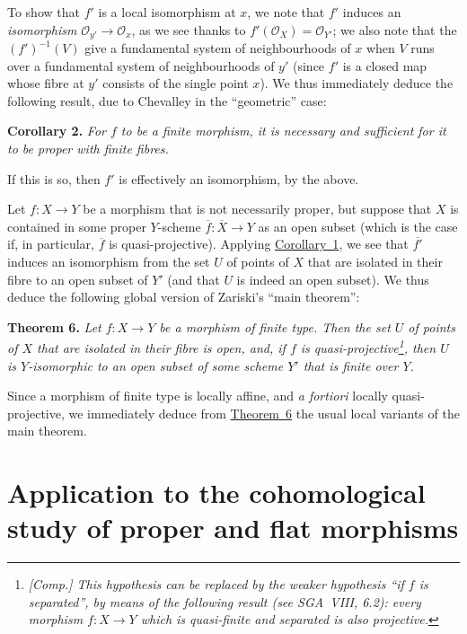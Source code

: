 \documentclass{article}
\newenvironment{itenv}[1]
  {\phantomsection\par\medskip\noindent\textbf{#1.}\itshape}
  {\par\medskip}
\newcommand{\scr}[1]{{\mathscr{#1}}}
\begin{document}
To show that $f'$ is a local isomorphism at $x$, we note that $f'$ induces an \emph{isomorphism} $\scr{O}_{y'}\to\scr{O}_x$, as we see thanks to $f'(\scr{O}_X)=\scr{O}_{Y'}$;
we also note that the $(f')^{-1}(V)$ give a fundamental system of neighbourhoods of $x$ when $V$ runs over a fundamental system of neighbourhoods of $y'$ (since $f'$ is a closed map whose fibre at $y'$ consists of the single point $x$).
We thus immediately deduce the following result, due to Chevalley in the ``geometric'' case:

\begin{itenv}{Corollary 2}
\label{theorem5corollary2}
  For $f$ to be a finite morphism, it is necessary and sufficient for it to be proper with finite fibres.
\end{itenv}

If this is so, then $f'$ is effectively an isomorphism, by the above.

Let $f\colon X\to Y$ be a morphism that is not necessarily proper, but suppose that $X$ is contained in some proper $Y$-scheme $\overline{f}\colon\overline{X}\to Y$ as an open subset (which is the case if, in particular, $\overline{f}$ is quasi-projective).
Applying \hyperref[theorem5corollary1]{Corollary~1}, we see that $\overline{f'}$ induces an isomorphism from the set $U$ of points of $X$ that are isolated in their fibre to an open subset of $Y'$ (and that $U$ is indeed an open subset).
We thus deduce the following global version of Zariski's ``main theorem'':

\begin{itenv}{Theorem 6}
\label{theorem6}
  Let $f\colon X\to Y$ be a morphism of finite type.
  Then the set $U$ of points of $X$ that are isolated in their fibre is open, and, if $f$ is quasi-projective\footnote{\emph{[Comp.] This hypothesis can be replaced by the weaker hypothesis ``if $f$ is separated'', by means of the following result (see SGA~VIII, 6.2): every morphism $f\colon X\to Y$ which is quasi-finite and separated is also projective.}}, then $U$ is $Y$-isomorphic to an open subset of some scheme $Y'$ that is finite over $Y$.
\end{itenv}

Since a morphism of finite type is locally affine, and \emph{a fortiori} locally quasi-projective, we immediately deduce from \hyperref[theorem6]{Theorem~6} the usual local variants of the main theorem.


\section{Application to the cohomological study of proper and flat morphisms}
\label{section5}
\end{document}
